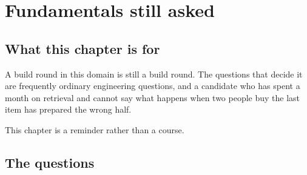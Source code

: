 \chapter{Fundamentals still asked}
\label{ch:fundamentals}

\section*{What this chapter is for}

A build round in this domain is still a build round. The questions that decide
it are frequently ordinary engineering questions, and a candidate who has spent
a month on retrieval and cannot say what happens when two people buy the last
item has prepared the wrong half.

This chapter is a reminder rather than a course. 

\section*{The questions}

